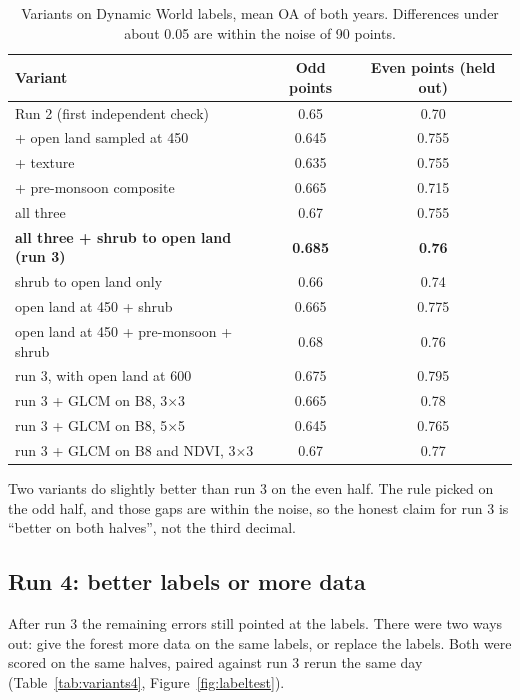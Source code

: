 \documentclass[11pt,a4paper]{article}
\begin{document}
\begin{table}[htbp]
\centering\small
\caption{Variants on Dynamic World labels, mean OA of both years. Differences under about 0.05 are within the noise of 90 points.}
\label{tab:variants3}
\begin{tabular}{@{}lcc@{}}
\toprule
Variant & Odd points & Even points (held out)\\
\midrule
Run 2 (first independent check) & 0.65 & 0.70\\
+ open land sampled at 450 & 0.645 & 0.755\\
+ texture & 0.635 & 0.755\\
+ pre-monsoon composite & 0.665 & 0.715\\
all three & 0.67 & 0.755\\
\textbf{all three + shrub to open land (run 3)} & \textbf{0.685} & \textbf{0.76}\\
shrub to open land only & 0.66 & 0.74\\
open land at 450 + shrub & 0.665 & 0.775\\
open land at 450 + pre-monsoon + shrub & 0.68 & 0.76\\
run 3, with open land at 600 & 0.675 & 0.795\\
run 3 + GLCM on B8, 3$\times$3 & 0.665 & 0.78\\
run 3 + GLCM on B8, 5$\times$5 & 0.645 & 0.765\\
run 3 + GLCM on B8 and NDVI, 3$\times$3 & 0.67 & 0.77\\
\bottomrule
\end{tabular}
\end{table}

Two variants do slightly better than run 3 on the even half. The rule picked on the odd half, and those gaps are within the noise, so the honest claim for run 3 is ``better on both halves'', not the third decimal.

\subsection{Run 4: better labels or more data}
After run 3 the remaining errors still pointed at the labels. There were two ways out: give the forest more data on the same labels, or replace the labels. Both were scored on the same halves, paired against run 3 rerun the same day (Table~\ref{tab:variants4}, Figure~\ref{fig:labeltest}).
\end{document}
